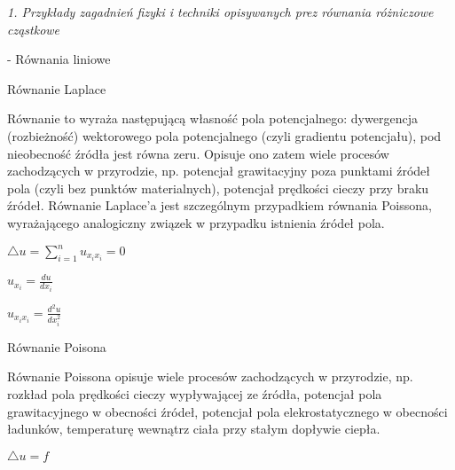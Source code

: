 \textit{1. Przykłady zagadnień fizyki i techniki opisywanych prez równania różniczowe cząstkowe}


- Równania liniowe

Równanie Laplace

Równanie to wyraża następującą własność pola potencjalnego: dywergencja (rozbieżność) wektorowego pola potencjalnego (czyli gradientu potencjału), pod nieobecność źródła jest równa zeru. Opisuje ono zatem wiele procesów zachodzących w przyrodzie, np. potencjał grawitacyjny poza punktami źródeł pola (czyli bez punktów materialnych), potencjał prędkości cieczy przy braku źródeł. Równanie Laplace’a jest szczególnym przypadkiem równania Poissona, wyrażającego analogiczny związek w przypadku istnienia źródeł pola.


$ \bigtriangleup u = \sum_{i=1}^{n} u_{x_ix_i} =0$

$ u_{x_i} = \frac{du}{dx_i}$

$ u_{x_i x_i} = \frac{d^2u}{dx_i^2}$

Równanie Poisona

Równanie Poissona opisuje wiele procesów zachodzących w przyrodzie, np. rozkład pola prędkości cieczy wypływającej ze źródła, potencjał pola grawitacyjnego w obecności źródeł, potencjał pola elekrostatycznego w obecności ładunków, temperaturę wewnątrz ciała przy stałym dopływie ciepła.

$ \bigtriangleup u =f$